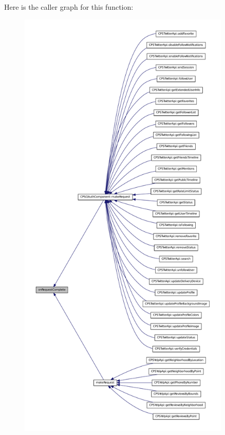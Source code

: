 Here is the caller graph for this function:\nopagebreak
\begin{figure}[H]
\begin{center}
\leavevmode
\includegraphics[height=600pt]{classCPSApiComponent_a2ad6936786c03a9799b272b89fbf0cd5_icgraph}
\end{center}
\end{figure}


